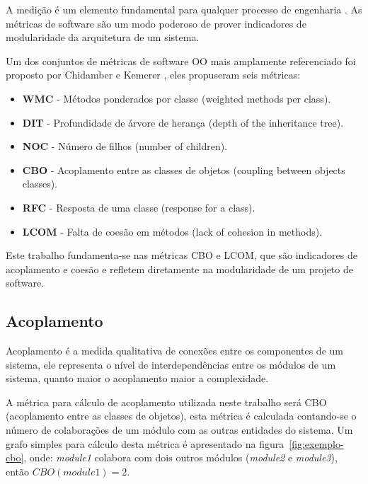 A medição é um elemento fundamental para qualquer processo de engenharia
\cite{engenhariaDeSoftwarePressman}. As métricas de software são um modo
poderoso de prover indicadores de modularidade da arquitetura de um
sistema\cite{OntheModular}. 

Um dos conjuntos de métricas de software OO
mais amplamente referenciado foi proposto por Chidamber e Kemerer
\cite{engenhariaDeSoftwarePressman}, eles propuseram seis métricas:

\begin{itemize}

\item {\bf WMC} -
Métodos ponderados por classe (weighted methods per class).

\item {\bf DIT} -
Profundidade de árvore de herança (depth of the inheritance tree).

\item {\bf NOC} -
Número de filhos (number of children).

\item {\bf CBO} -
Acoplamento entre as classes de objetos (coupling between objects classes).

\item {\bf RFC} -
Resposta de uma classe (response for a class).

\item {\bf LCOM} -
Falta de coesão em métodos (lack of cohesion in methods).

\end{itemize}

Este trabalho fundamenta-se nas métricas CBO e LCOM, que são indicadores de
acoplamento e coesão e refletem diretamente na modularidade de um projeto de
software.

\subsection{Acoplamento}

Acoplamento é a medida qualitativa de conexões entre os componentes de um
sistema, ele representa o nível de interdependências entre os módulos de um
sistema, quanto maior o acoplamento maior a complexidade.

A métrica para cálculo de acoplamento utilizada neste trabalho será CBO
(acoplamento entre as classes de objetos), esta métrica é calculada contando-se
o número de colaborações de um módulo com as outras entidades do sistema.  Um
grafo simples para cálculo desta métrica é apresentado na
figura~\ref{fig:exemplo-cbo}, onde: {\it module1} colabora com dois outros
módulos ({\it module2} e {\it module3}), então $CBO(module1) = 2$.

